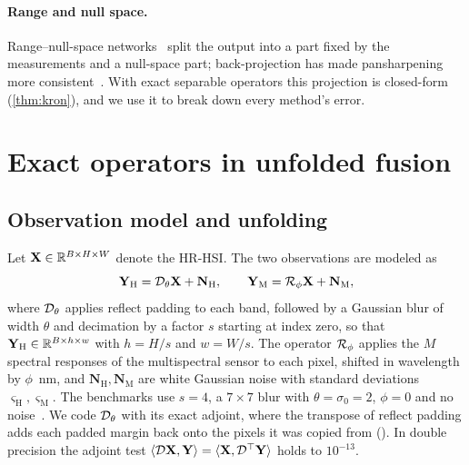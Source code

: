 \documentclass[10pt,twocolumn,letterpaper]{article}
\begin{document}
\paragraph{Range and null space.} Range--null-space networks~\cite{chen2020decomposition} split the output into a part fixed by the measurements and a null-space part; back-projection has made pansharpening more consistent~\cite{vicinanza2014consistency}. With exact separable operators this projection is closed-form (\cref{thm:kron}), and we use it to break down every method's error.

\section{Exact operators in unfolded fusion}
\label{sec:theory}
\subsection{Observation model and unfolding}
\label{sec:hqs}
Let $\mathbf{X}\in\mathbb{R}^{B\times H\times W}$ denote the HR-HSI. The two observations are modeled as
\begin{equation}
\mathbf{Y}_{\mathrm{H}}=\mathcal{D}_\theta\mathbf{X}+\mathbf{N}_{\mathrm{H}},\qquad \mathbf{Y}_{\mathrm{M}}=\mathcal{R}_\phi\mathbf{X}+\mathbf{N}_{\mathrm{M}},
\label{eq:obs}
\end{equation}
where $\mathcal{D}_\theta$ applies reflect padding to each band, followed by a Gaussian blur of width $\theta$ and decimation by a factor $s$ starting at index zero, so that $\mathbf{Y}_{\mathrm{H}}\in\mathbb{R}^{B\times h\times w}$ with $h=H/s$ and $w=W/s$. The operator $\mathcal{R}_\phi$ applies the $M$ spectral responses of the multispectral sensor to each pixel, shifted in wavelength by $\phi$~nm, and $\mathbf{N}_{\mathrm{H}},\mathbf{N}_{\mathrm{M}}$ are white Gaussian noise with standard deviations $\varsigma_{\mathrm{H}},\varsigma_{\mathrm{M}}$. The benchmarks use $s=4$, a $7\times7$ blur with $\theta=\sigma_0=2$, $\phi=0$ and no noise~\cite{chen2026twostage}. We code $\mathcal{D}_\theta$ with its exact adjoint, where the transpose of reflect padding adds each padded margin back onto the pixels it was copied from (\supp). In double precision the adjoint test $\langle\mathcal{D}\mathbf{X},\mathbf{Y}\rangle=\langle\mathbf{X},\mathcal{D}^{\top}\mathbf{Y}\rangle$ holds to $10^{-13}$.
\end{document}
